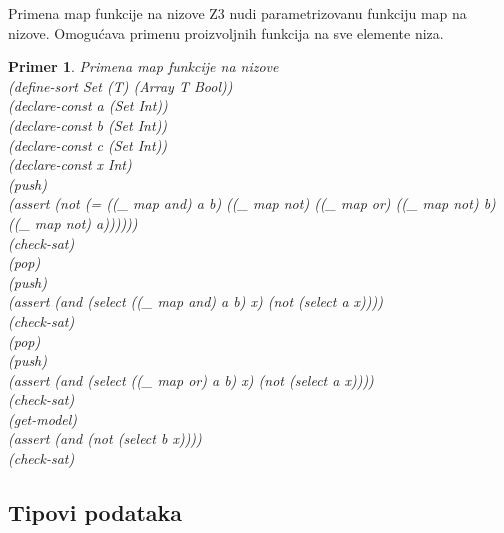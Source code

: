 \documentclass[12pt,oneside]{memoir}
\newtheorem{primer}{Primer}
\begin{document}
Primena map funkcije na nizove
Z3 nudi parametrizovanu funkciju map na nizove. Omogućava primenu proizvoljnih funkcija na sve elemente niza. 
\\
\begin{primer} Primena map funkcije na nizove
\\(define-sort Set (T) (Array T Bool))
\\(declare-const a (Set Int))
\\(declare-const b (Set Int))
\\(declare-const c (Set Int))
\\(declare-const x Int)
\\(push)
\\(assert (not (= ((\_ map and) a b) ((\_ map not) ((\_ map or) ((\_ map not) b) ((\_ map not) a))))))
\\(check-sat)
\\(pop)
\\(push) 
\\(assert (and (select ((\_ map and) a b) x) (not (select a x))))
\\(check-sat)
\\(pop)
\\(push) 
\\(assert (and (select ((\_ map or) a b) x) (not (select a x))))
\\(check-sat)
\\(get-model)
\\(assert (and (not (select b x))))
\\(check-sat)
\end{primer}

\subsection{Tipovi podataka}
\end{document}
